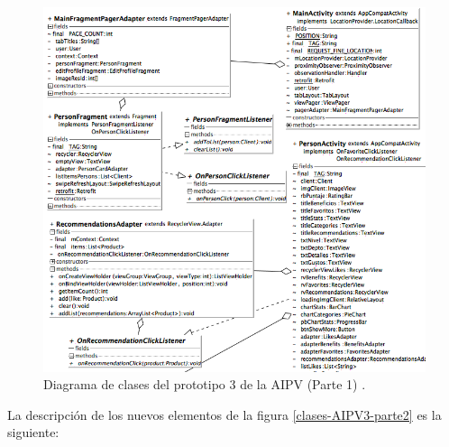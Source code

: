 \FloatBarrier
\begin{figure}[htbp!]
		\centering
			\includegraphics[width=.8 \textwidth]{imagenes/adrian/vendedor/prototipo3/clases_1}
		\caption{Diagrama de clases del prototipo 3 de la AIPV (Parte 1) .}
		\label{clases-AIPV3-parte1}
\end{figure}
\FloatBarrier

La descripción de los nuevos elementos de la figura \ref{clases-AIPV3-parte2} es la siguiente: 

